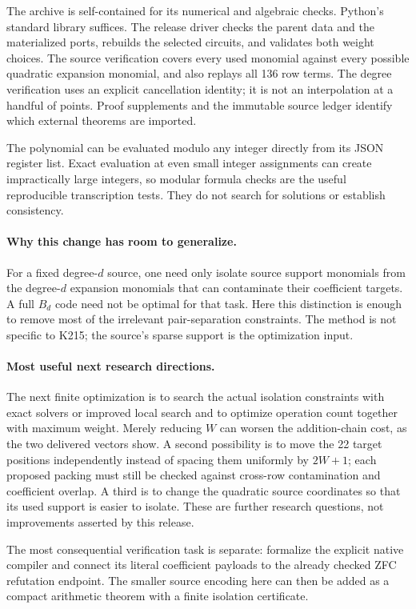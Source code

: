 \documentclass[11pt]{article}
\theoremstyle{definition}\newtheorem{definition}[theorem]{Definition}
\begin{document}
The archive is self-contained for its numerical and algebraic checks.
Python's standard library suffices. The release driver checks the
parent data and the materialized ports, rebuilds the selected circuits,
and validates both weight choices. The source verification covers every
used monomial against every possible quadratic expansion monomial, and
also replays all 136 row terms. The degree verification uses an explicit
cancellation identity; it is not an interpolation at a handful of points.
Proof supplements and the immutable source ledger identify which
external theorems are imported.

The polynomial can be evaluated modulo any integer directly from its
JSON register list. Exact evaluation at even small integer assignments
can create impractically large integers, so modular formula checks are
the useful reproducible transcription tests. They do not search for
solutions or establish consistency.

\paragraph{Why this change has room to generalize.}
For a fixed degree-$d$ source, one need only isolate source support
monomials from the degree-$d$ expansion monomials that can contaminate
their coefficient targets. A full $B_d$ code need not be optimal for
that task. Here this distinction is enough to remove most of the
irrelevant pair-separation constraints. The method is not specific to
K215; the source's sparse support is the optimization input.

\paragraph{Most useful next research directions.}
The next finite optimization is to search the actual isolation
constraints with exact solvers or improved local search and to optimize
operation count together with maximum weight. Merely reducing $W$ can
worsen the addition-chain cost, as the two delivered vectors show.
A second possibility is to move the 22 target positions independently
instead of spacing them uniformly by $2W+1$; each proposed packing must
still be checked against cross-row contamination and coefficient
overlap. A third is to change the quadratic source coordinates so that
its used support is easier to isolate. These are further research
questions, not improvements asserted by this release.

The most consequential verification task is separate: formalize the
explicit native compiler and connect its literal coefficient payloads
to the already checked ZFC refutation endpoint. The smaller source
encoding here can then be added as a compact arithmetic theorem with
a finite isolation certificate.
\end{document}

